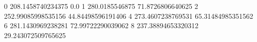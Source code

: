 0 208.1458740234375 0.0
1 280.0185546875 71.8726806640625
2 252.99085998535156 44.84498596191406
4 273.4607238769531 65.31484985351562
6 281.1430969238281 72.99722290039062
8 237.38894653320312 29.243072509765625
